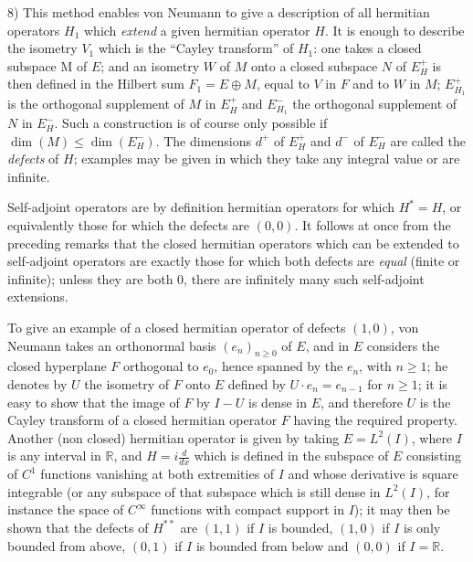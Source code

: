 \documentclass[12pt,a4paper,leqno,twoside]{extbook}
\newcommand{\R}{\mathbb{R}}
\begin{document}
8) This method enables von Neumann to give a description of all hermitian operators \(H_1\) which \emph{extend} a given hermitian operator \(H\). It is enough to describe the isometry \(V_1\) which is the ``Cayley transform'' of \(H_1\): one takes a closed subspace M of \(E\); and an isometry \(W\) of \(M\) onto a closed subspace \(N\) of \(E_H^+\) is then defined in the Hilbert sum \(F_1 = E \oplus M\), equal to \(V\) in \(F\) and to \(W\) in \(M\); \(E^+_{H_1}\) is the orthogonal supplement of \(M\) in \(E^+_H\) and \(E^-_{H_1}\) the orthogonal supplement of \(N\) in \(E^-_H\). Such a construction is of course only possible if \(\dim(M) \leq \dim(E^-_H)\). The dimensions \(d^+\) of \(E^+_H\) and \(d^-\) of \(E^-_H\) are called the \emph{defects} of \(H\); examples may be given in which they take any integral value or are infinite.

Self-adjoint operators are by definition hermitian operators for which \(H^* = H\), or equivalently those for which the defects are \((0,0)\). It follows at once from the preceding remarks that the closed hermitian operators which can be extended to self-adjoint operators are exactly those for which both defects are \emph{equal} (finite or infinite); unless they are both 0, there are infinitely many such self-adjoint extensions.

To give an example of a closed hermitian operator of defects \((1,0)\), von Neumann takes an orthonormal basis \((e_n)_{n \geq 0}\) of \(E\), and in \(E\) considers the closed hyperplane \(F\) orthogonal to \(e_0\), hence spanned by the \(e_n\), with \(n \geq 1\); he denotes by \(U\) the isometry of \(F\) onto \(E\) defined by \(U \cdot e_n = e_{n-1}\) for \(n \geq 1\); it is easy to show that the image of \(F\) by \(I - U\) is dense in \(E\), and therefore \(U\) is the Cayley transform of a closed hermitian operator \(F\) having the required property. Another (non closed) hermitian operator is given by taking \(E = L^2(I)\), where \(I\) is any interval in \(\R\), and \(H = i\frac{d}{dx}\) which is defined in the subspace of \(E\) consisting of \(C^1\) functions vanishing at both extremities of \(I\) and whose derivative is square integrable (or any subspace of that subspace which is still dense in \(L^2(I)\), for instance the space of \(C^\infty\) functions with compact support in \(I\)); it may then be shown that the defects of \(H^{**}\) are \((1,1)\) if \(I\) is bounded, \((1,0)\) if \(I\) is only bounded from above, \((0,1)\) if \(I\) is bounded from below and \((0,0)\) if \(I = \R\).
\end{document}
